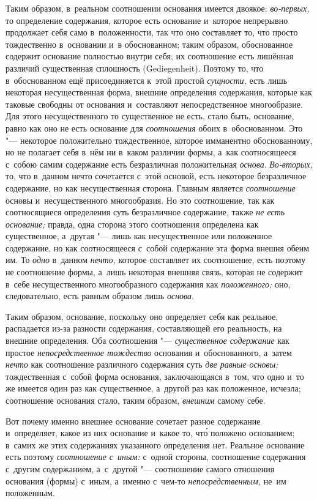 Таким образом, в~реальном соотношении основания имеется двоякое:
{\em во-первых,} то определение содержания, которое есть основание и~которое
непрерывно продолжает себя само в~положенности, так что оно составляет то, что
просто тождественно в~основании и~в обоснованном; таким образом, обоснованное
содержит основание полностью внутри себя; их соотношение есть лишённая различий
существенная сплошность (Gedie\-gen\-heit). Поэтому то, что в~обоснованном ещё
присоединяется к~этой простой {\em сущности,} есть лишь некоторая
несущественная форма, внешние определения содержания, которые как таковые
свободны от основания и~составляют непосредственное многообразие. Для этого
несущественного то существенное не есть, стало быть, основание, равно как оно
не есть основание для {\em соотношения} обоих в~обоснованном. Это "---
некоторое положительно тождественное, которое имманентно обоснованному, но не
полагает себя в~нём ни в~каком различии формы, а~как соотносящееся с~собою
самим содержание есть безразличная положительная {\em основа}. {\em Во-вторых,}
то, что в~данном нечто сочетается с~этой основой, есть некоторое безразличное
содержание, но как несущественная сторона. Главным является {\em соотношение}
основы и~несущественного многообразия. Но это соотношение, так как
соотносящиеся определения суть безразличное содержание, также {\em не есть
основание;} правда, одна сторона этого соотношения определена как существенное,
а~другая "--- лишь как несущественное или положенное содержание, но как
соотносящееся с~собой содержание эта форма внешня обеим им. То {\em одно}
в~данном {\em нечто,} которое составляет их соотношение, есть поэтому не
соотношение формы, а~лишь некоторая внешняя связь, которая не содержит в~себе
несущественного многообразного содержания как {\em положенного;} оно,
следовательно, есть равным образом лишь {\em основа}.

Таким образом, основание, поскольку оно определяет себя как реальное,
распадается из-за разности содержания, составляющей его реальность, на внешние
определения. Оба соотношения "--- {\em существенное содержание} как простое
{\em непосредственное тождество} основания и~обоснованного, а~затем {\em нечто}
как соотношение различного содержания суть {\em две равные основы;}
тождественная с~собой форма основания, заключающаяся в~том, что одно и~то же
имеется один раз как существенное, а~другой раз как положенное, исчезла;
соотношение основания стало, таким образом, {\em внешним} самому себе.

Вот почему именно внешнее основание сочетает разное содержание и~определяет,
какое из них основание и~какое то, чт\'{о} положено основанием; в~самих же
этих содержаниях указанного определения нет. Реальное основание есть поэтому
{\em соотношение с~иным:} с~одной стороны, соотношение содержания с~другим
содержанием, а~с~другой "--- соотношение самого отношения основания (формы)
с~иным, а~именно с~чем-то {\em непосредственным,} не~им положенным.

